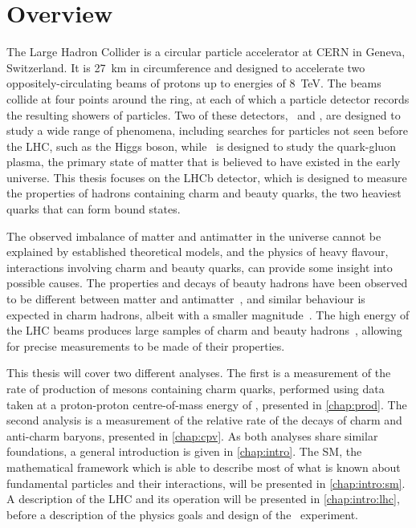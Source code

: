 \chapter{Overview}
\label{chap:intro:overview}

The Large Hadron Collider is a circular particle accelerator at CERN in Geneva, 
Switzerland.
It is \SI{27}{\kilo\metre} in circumference and designed to accelerate two 
oppositely-circulating beams of protons up to energies of \SI{8}{\TeV}.
The beams collide at four points around the ring, at each of which a particle 
detector records the resulting showers of particles.
Two of these detectors, \atlas\ and \cms, are designed to study a wide range of 
phenomena, including searches for particles not seen before the \ac{LHC}, such 
as the Higgs boson, while \alice\ is designed to study the quark-gluon plasma, 
the primary state of matter that is believed to have existed in the early 
universe.
This thesis focuses on the LHCb detector, which is designed to measure the 
properties of hadrons containing charm and beauty quarks, the two heaviest 
quarks that can form bound states.

The observed imbalance of matter and antimatter in the universe cannot be 
explained by established theoretical models, and the physics of heavy flavour, 
interactions involving charm and beauty quarks, can provide some insight into 
possible causes.
The properties and decays of beauty hadrons have been observed to be different 
between matter and 
antimatter~\cite{Aubert:2001nu,Abe:2001xe,Aaij:2012kz,Aaij:2013iua,Aaij:2016cla}, 
and similar behaviour is expected in charm hadrons, albeit with a smaller 
magnitude~\cite{Grossman:2006jg}.
The high energy of the \ac{LHC} beams produces large samples of charm and 
beauty hadrons~\cite{LHCb-PAPER-2012-041,LHCb-PAPER-2013-004}, allowing for 
precise measurements to be made of their properties.

This thesis will cover two different analyses.
The first is a measurement of the rate of production of mesons containing charm 
quarks, performed using data taken at a proton-proton centre-of-mass energy of 
\runtwocom, presented in \cref{chap:prod}.
The second analysis is a measurement of the relative rate of the decays of 
charm and anti-charm baryons, presented in \cref{chap:cpv}.
As both analyses share similar foundations, a general introduction is given in 
\cref{chap:intro}.
The \acl{SM}, the mathematical framework which is able to describe most of what 
is known about fundamental particles and their interactions, will be presented 
in \cref{chap:intro:sm}.
A description of the \acl{LHC} and its operation will be presented in 
\cref{chap:intro:lhc}, before a description of the physics goals and design of 
the \lhcb\ experiment.
